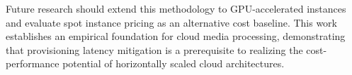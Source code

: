 \documentclass[conference]{IEEEtran}
\begin{document}
Future research should extend this methodology to GPU-accelerated instances and evaluate spot instance pricing as an alternative cost baseline. This work establishes an empirical foundation for cloud media processing, demonstrating that provisioning latency mitigation is a prerequisite to realizing the cost-performance potential of horizontally scaled cloud architectures.


%
%
%
%
%
\end{document}
